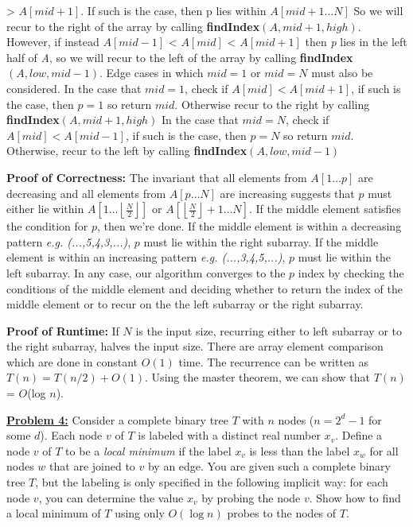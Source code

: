 \documentclass[11pt]{article}
\begin{document}
\begin{flushleft}
		\textgreater{ $A[mid + 1]$}. If such is the case, then p lies within $A[mid + 1 \dots N]$ So we will recur to the right of the array by calling \textbf{findIndex}$(A, mid + 1, high)$.
		However, if instead $A[mid - 1]$ \textless{ $A[mid]$} \textless { $A[mid + 1]$} then \emph{p} lies in the left half of \emph{A}, so we will recur to the left of the array by calling
		\textbf{findIndex$(A, low, mid -1)$}.\newpage
		Edge cases in which $mid = 1$ or $mid = N$ must also be considered.\newline
		In the case that $mid = 1$, check if $A[mid] < A[mid + 1]$, if such is the case, then $p = 1$ so return $mid$. Otherwise recur to the right by calling \textbf{findIndex}$(A, mid + 1, high)$\newline
		In the case that $mid = N$, check if $A[mid] < A[mid - 1]$, if such is the case, then $p = N$ so return $mid$. Otherwise, recur to the left by calling \textbf{findIndex}$(A, low, mid - 1)$\newline
		  
		\textbf{Proof of Correctness:} The invariant that all elements from $A[1 \dots p]$ are decreasing and all elements from $A[p \dots N]$ are increasing suggests that $p$ must either lie within $A[1 \dots \left\lfloor\frac{N}{2}\right\rfloor]$ or 
		$A[\left\lfloor\frac{N}{2}\right\rfloor + 1 \dots N]$. \newline
		If the middle element satisfies the condition for $p$, then we're done.
		If the middle element is within a decreasing pattern \emph{e.g. (...,5,4,3,...)}, $p$ must lie within the right subarray.  
		If the middle element is within an increasing pattern \emph{e.g. (...,3,4,5,...)}, $p$ must lie within the left subarray.
		In any case, our algorithm converges to the $p$ index by checking the conditions of the middle element and deciding whether to return the index of the middle element or to recur on the the left subarray or the right subarray. \newline
		\vspace{0.2cm}
		
		\textbf{Proof of Runtime:} If $N$ is the input size, recurring either to left subarray or to the right subarray, halves the input size. There are array element comparison which are done in constant $O(1)$ time. The recurrence can be written as $T(n) = T(n / 2) + O(1)$. Using the master theorem, we can show that $T(n)$ = $O$(log $n$).
		\vspace{0.2cm}
		
		\item \textbf {\underline{Problem 4:}} Consider a complete binary tree $T$ with $n$ nodes ($n = 2^d-1$ for some $d$). Each node $v$ of $T$ is labeled with a distinct real number $x_v$. Define a node $v$ of $T$ to be a \textit{local minimum} if the label $x_v$ is less than the label $x_w$ for all nodes $w$ that are joined to $v$ by an edge. You are given such a complete binary tree $T$, but the labeling is only specified in the following implicit way: for each node $v$, you can determine the value $x_v$ by probing the node $v$. Show how to find a local minimum of $T$ using only $O(\log n)$ probes to the nodes of $T$.\newline
		

\end{flushleft}
\end{document}
